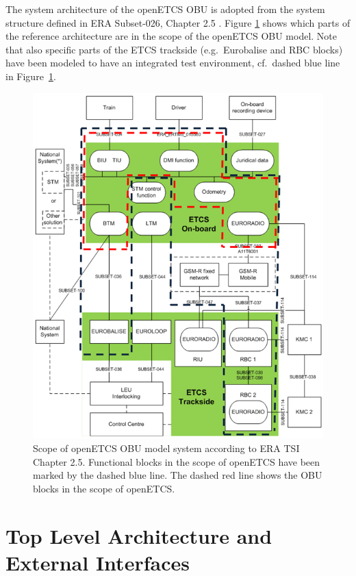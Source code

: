 
The system architecture of the openETCS OBU is adopted from the system structure defined in ERA Subset-026, Chapter 2.5 \cite{subset-026}. Figure \ref{f:architecture_srs} shows which parts of the reference architecture are in the scope of the openETCS OBU model. Note that also specific parts of the ETCS trackside (e.g.~Eurobalise and RBC blocks) have been modeled to have an integrated test environment, cf.~dashed blue line in Figure~\ref{f:architecture_srs}.

\begin{figure}
\centering
\includegraphics[width=.7\textwidth]{images/ArchitectureSRS}
\caption[Scope of openETCS OBU model system according to ERA TSI Chapter 2.5.]{Scope of openETCS OBU model system according to ERA TSI Chapter 2.5. Functional blocks in the scope of openETCS have been marked by the dashed blue line. The dashed red line shows the OBU blocks in the scope of openETCS.}
\label{f:architecture_srs}
\end{figure}


\section{Top Level Architecture and External Interfaces}

